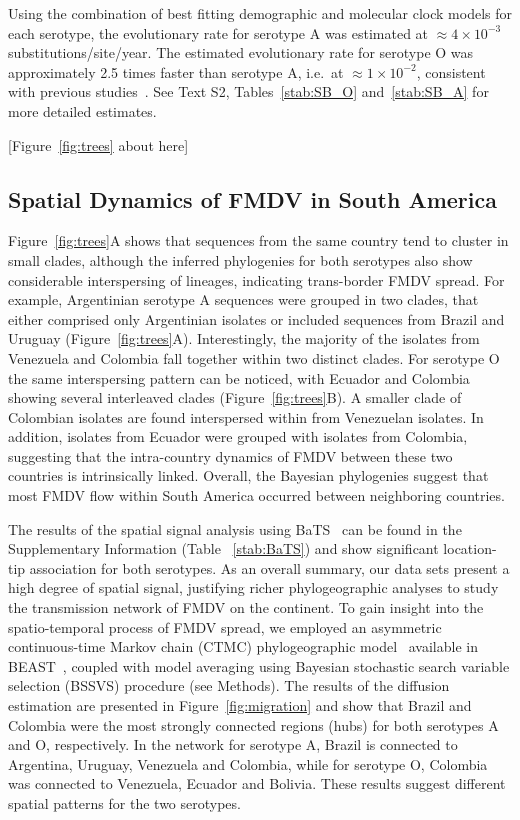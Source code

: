\documentclass[10pt]{article}
\begin{document}
Using the combination of best fitting demographic and molecular clock models for each serotype, the evolutionary rate for serotype A was estimated at $\approx 4 \times 10^{-3}$ substitutions/site/year.
The estimated evolutionary rate for serotype O was approximately 2.5 times faster than serotype A, i.e.~at $\approx 1 \times 10^{-2}$, consistent with previous studies~\cite{tully, Carvalho2013, Muellner2011}.
See Text S2, Tables~\ref{stab:SB_O} and~\ref{stab:SB_A} for more detailed estimates.

\begin{center}
 [Figure~\ref{fig:trees} about here]
\end{center}


\subsection*{Spatial Dynamics of FMDV in South America}

Figure~\ref{fig:trees}A shows that sequences from the same country tend to cluster in small clades, although the inferred phylogenies for both serotypes also show considerable interspersing of lineages, indicating trans-border FMDV spread.
For example, Argentinian serotype A sequences were grouped in two clades, that either comprised only Argentinian isolates or included sequences from Brazil and Uruguay (Figure~\ref{fig:trees}A).
Interestingly, the majority of the isolates from Venezuela and Colombia fall together within two distinct clades.
For serotype O the same interspersing pattern can be noticed, with Ecuador and Colombia showing several interleaved clades (Figure~\ref{fig:trees}B).
A smaller clade of Colombian isolates are found interspersed within from Venezuelan isolates.
In addition, isolates from Ecuador were grouped with isolates from Colombia, suggesting that the intra-country dynamics of FMDV between these two countries is intrinsically linked.
Overall, the Bayesian phylogenies suggest that most FMDV flow within South America occurred between neighboring countries. 

The results of the spatial signal analysis using BaTS~\cite{bats} can be found in the Supplementary Information (Table ~\ref{stab:BaTS}) and show significant location-tip association for both serotypes.
As an overall summary, our data sets present a high degree of spatial signal, justifying richer phylogeographic analyses to study the transmission network of FMDV on the continent.
To gain insight into the spatio-temporal process of FMDV spread, we employed an asymmetric continuous-time Markov chain (CTMC) phylogeographic model~\cite{roots} available in BEAST~\cite{beast2012}, coupled  with model averaging using Bayesian stochastic search variable selection (BSSVS) procedure (see Methods).
The results of the diffusion estimation are presented in Figure~\ref{fig:migration} and show that Brazil and Colombia were the most strongly connected regions (hubs) for both serotypes A and O, respectively. 
In the network for serotype A, Brazil is connected to Argentina, Uruguay, Venezuela and Colombia, while for serotype O, Colombia was connected to Venezuela, Ecuador and Bolivia.
These results suggest different spatial patterns for the two serotypes.
\end{document}
